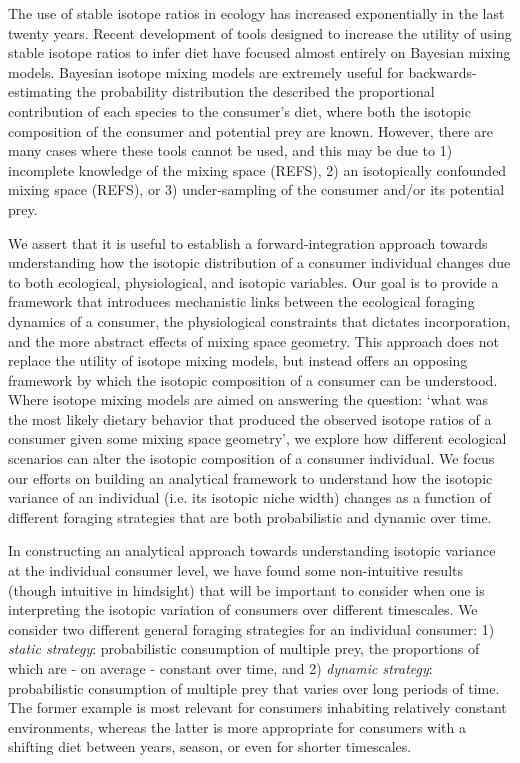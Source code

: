 \documentclass{frontiersSCNS}
\begin{document}
The use of stable isotope ratios in ecology has increased exponentially in the last twenty years.
Recent development of tools designed to increase the utility of using stable isotope ratios to infer diet have focused almost entirely on Bayesian mixing models.
Bayesian isotope mixing models are extremely useful for backwards-estimating the probability distribution the described the proportional contribution of each species to the consumer's diet, where both the isotopic composition of the consumer and potential prey are known.
However, there are many cases where these tools cannot be used, and this may be due to
1) incomplete knowledge of the mixing space (REFS),
2) an isotopically confounded mixing space (REFS), or
3) under-sampling of the consumer and/or its potential prey.

We assert that it is useful to establish a forward-integration approach towards understanding how the isotopic distribution of a consumer individual changes due to both ecological, physiological, and isotopic variables.
Our goal is to provide a framework that introduces mechanistic links between the ecological foraging dynamics of a consumer, the physiological constraints that dictates incorporation, and the more abstract effects of mixing space geometry.
This approach does not replace the utility of isotope mixing models, but instead offers an opposing framework by which the isotopic composition of a consumer can be understood.
Where isotope mixing models are aimed on answering the question: `what was the most likely dietary behavior that produced the observed isotope ratios of a consumer given some mixing space geometry', we explore how different ecological scenarios can alter the isotopic composition of a consumer individual.
We focus our efforts on building an analytical framework to understand how the isotopic variance of an individual (i.e. its isotopic niche width) changes as a function of different foraging strategies that are both probabilistic and dynamic over time.


In constructing an analytical approach towards understanding isotopic variance at the individual consumer level, we have found some non-intuitive results (though intuitive in hindsight) that will be important to consider when one is interpreting the isotopic variation of consumers over different timescales.
We consider two different general foraging strategies for an individual consumer:
1) {\it static strategy}: probabilistic consumption of multiple prey, the proportions of which are - on average - constant over time, and 
2) {\it dynamic strategy}: probabilistic consumption of multiple prey that varies over long periods of time.
The former example is most relevant for consumers inhabiting relatively constant environments, whereas the latter is more appropriate for consumers with a shifting diet between years, season, or even for shorter timescales.
\end{document}
